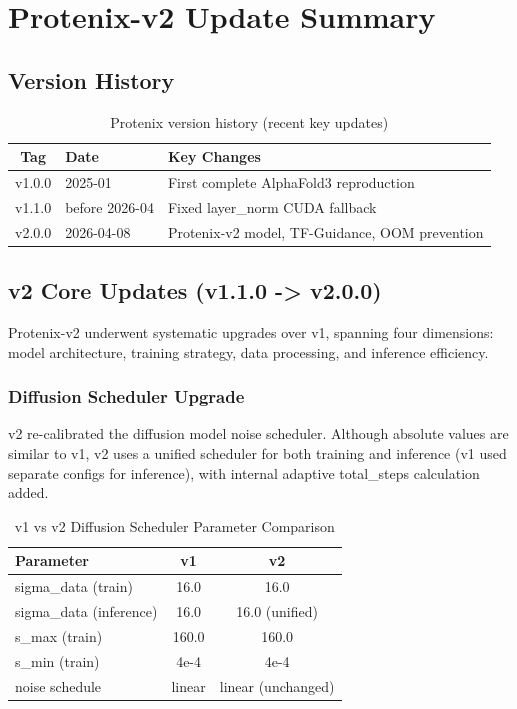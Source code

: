 \documentclass[12pt,a4paper]{article}
\begin{document}
\section{Protenix-v2 Update Summary}

\subsection{Version History}

\begin{table}[h]
    \centering
    \caption{Protenix version history (recent key updates)}
    \begin{tabular}{cll}
        \toprule
        \textbf{Tag} & \textbf{Date} & \textbf{Key Changes} \\
        \midrule
        v1.0.0 & 2025-01 & First complete AlphaFold3 reproduction \\
        v1.1.0 & before 2026-04 & Fixed layer_norm CUDA fallback \\
        v2.0.0 & 2026-04-08 & Protenix-v2 model, TF-Guidance, OOM prevention \\
        \bottomrule
    \end{tabular}
\end{table}

\subsection{v2 Core Updates (v1.1.0 -> v2.0.0)}

Protenix-v2 underwent systematic upgrades over v1, spanning four dimensions: model architecture, training strategy, data processing, and inference efficiency.

\subsubsection{Diffusion Scheduler Upgrade}

v2 re-calibrated the diffusion model noise scheduler. Although absolute values are similar to v1, v2 uses a unified scheduler for both training and inference (v1 used separate configs for inference), with internal adaptive total_steps calculation added.

\begin{table}[h]
    \centering
    \caption{v1 vs v2 Diffusion Scheduler Parameter Comparison}
    \begin{tabular}{lcc}
        \toprule
        \textbf{Parameter} & \textbf{v1} & \textbf{v2} \\
        \midrule
        sigma_data (train) & 16.0 & 16.0 \\
        sigma_data (inference) & 16.0 & 16.0 (unified) \\
        s_max (train) & 160.0 & 160.0 \\
        s_min (train) & 4e-4 & 4e-4 \\
        noise schedule & linear & linear (unchanged) \\
        \bottomrule
    \end{tabular}
\end{table}
\end{document}
